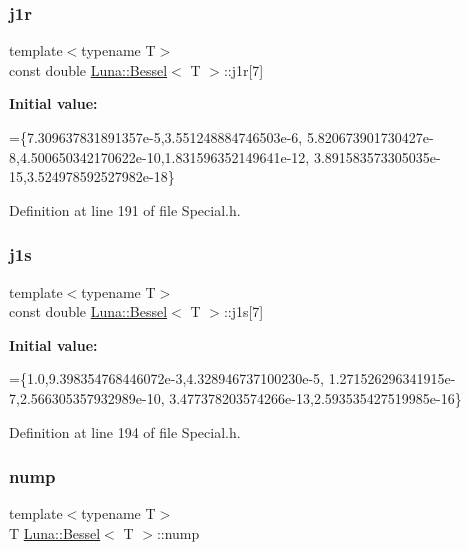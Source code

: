 \subsubsection{\texorpdfstring{j1r}{j1r}}
{\footnotesize\ttfamily template$<$typename T$>$ \\
const double \hyperlink{structLuna_1_1Bessel}{Luna\+::\+Bessel}$<$ T $>$\+::j1r\mbox{[}7\mbox{]}}

{\bfseries Initial value\+:}
\begin{DoxyCode}
=\{7.309637831891357e-5,3.551248884746503e-6,
        5.820673901730427e-8,4.500650342170622e-10,1.831596352149641e-12,
        3.891583573305035e-15,3.524978592527982e-18\}
\end{DoxyCode}


Definition at line 191 of file Special.\+h.

\mbox{\label{structLuna_1_1Bessel_a70050646ad99739a25c73bcf1d7be60e}} 
\subsubsection{\texorpdfstring{j1s}{j1s}}
{\footnotesize\ttfamily template$<$typename T$>$ \\
const double \hyperlink{structLuna_1_1Bessel}{Luna\+::\+Bessel}$<$ T $>$\+::j1s\mbox{[}7\mbox{]}}

{\bfseries Initial value\+:}
\begin{DoxyCode}
=\{1.0,9.398354768446072e-3,4.328946737100230e-5,
        1.271526296341915e-7,2.566305357932989e-10,
        3.477378203574266e-13,2.593535427519985e-16\}
\end{DoxyCode}


Definition at line 194 of file Special.\+h.

\mbox{\label{structLuna_1_1Bessel_a01ee09f3e4275f102df4c3b83fad1776}} 
\subsubsection{\texorpdfstring{nump}{nump}}
{\footnotesize\ttfamily template$<$typename T$>$ \\
T \hyperlink{structLuna_1_1Bessel}{Luna\+::\+Bessel}$<$ T $>$\+::nump}



